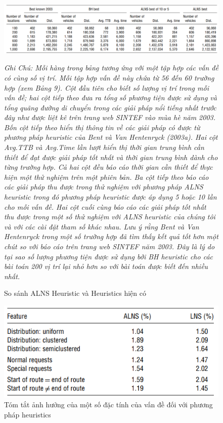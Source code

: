 \begin{center}
    \begin{figure}[htp]
    \caption{So sánh ALNS Heuristic và Heuristics hiện có}        
    \begin{center}
     \includegraphics[scale=.5]{figures/Thuy_table7}
    \end{center}
  \textit{Ghi Chú: Mỗi hàng trong bảng tương ứng với một tập hợp các vấn đề có cùng số vị trí. Mỗi tập hợp vấn đề này chứa từ 56 đến 60 trường hợp (xem Bảng 9). Cột đầu tiên cho biết số lượng vị trí trong mỗi vấn đề; hai cột tiếp theo đưa ra tổng số phương tiện được sử dụng và tổng quãng đường di chuyển trong các giải pháp nổi tiếng nhất trước đây như được liệt kê trên trang web SINTEF vào mùa hè năm 2003. Bốn cột tiếp theo hiển thị thông tin về các giải pháp có được từ phương pháp heuristic của Bent và Van Hentenryck (2003a). Hai cột Avg.TTB và Avg.Time lần lượt hiển thị thời gian trung bình cần thiết để đạt được giải pháp tốt nhất và thời gian trung bình dành cho từng trường hợp. Cả hai cột đều báo cáo thời gian cần thiết để thực hiện một thử nghiệm trên một phiên bản. Ba cột tiếp theo báo cáo các giải pháp thu được trong thử nghiệm với phương pháp ALNS heuristic trong đó phương pháp heuristic được áp dụng 5 hoặc 10 lần cho mỗi vấn đề. Hai cột cuối cùng báo cáo các giải pháp tốt nhất thu được trong một số thử nghiệm với ALNS heuristic của chúng tôi và với các cài đặt tham số khác nhau. Lưu ý rằng Bent và Van Hentenryck trong một số trường hợp đã tìm thấy kết quả tốt hơn một chút so với báo cáo trên trang web SINTEF năm 2003. Đây là lý do tại sao số lượng phương tiện được sử dụng bởi BH heuristic cho các bài toán 200 vị trí lại nhỏ hơn so với bài toán được biết đến nhiều nhất.}
    \end{figure}
\end{center}


\begin{center}
    \begin{figure}[htp]
    \caption{Tóm tắt ảnh hưởng của một số đặc tính của vấn đề đối với phương pháp heuristics}        
    \begin{center}
     \includegraphics[scale=.5]{figures/Thuy_table8}
    \end{center}
    \end{figure}
\end{center}


